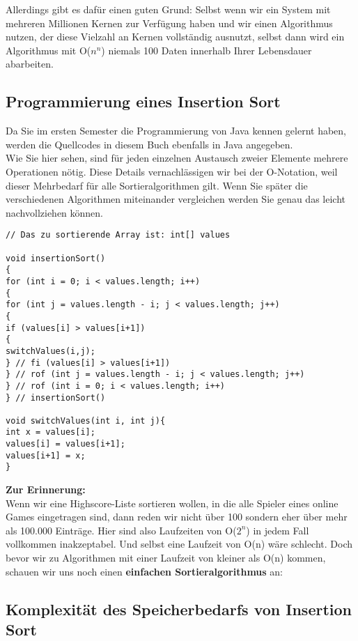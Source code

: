 Allerdings gibt es dafür einen guten Grund: Selbst wenn wir ein System mit mehreren Millionen Kernen zur Verfügung haben und wir einen Algorithmus nutzen, der diese Vielzahl an Kernen vollständig ausnutzt, selbst dann wird ein Algorithmus mit O(\(n^n\)) niemals 100 Daten innerhalb Ihrer Lebensdauer abarbeiten.

\subsection{Programmierung eines Insertion Sort}

Da Sie im ersten Semester die Programmierung von Java kennen gelernt haben, werden die Quellcodes in diesem Buch ebenfalls in Java angegeben.\\

Wie Sie hier sehen, sind für jeden einzelnen Austausch zweier Elemente mehrere Operationen nötig. Diese Details vernachlässigen wir bei der O-Notation, weil dieser Mehrbedarf für alle Sortieralgorithmen gilt. Wenn Sie später die verschiedenen Algorithmen miteinander vergleichen werden Sie genau das leicht nachvollziehen können.

\begin{verbatim}
// Das zu sortierende Array ist: int[] values

void insertionSort()
{
for (int i = 0; i < values.length; i++)
{
for (int j = values.length - i; j < values.length; j++)
{
if (values[i] > values[i+1])
{
switchValues(i,j);
} // fi (values[i] > values[i+1])
} // rof (int j = values.length - i; j < values.length; j++)
} // rof (int i = 0; i < values.length; i++)
} // insertionSort()

void switchValues(int i, int j){
int x = values[i];
values[i] = values[i+1];
values[i+1] = x;
}
\end{verbatim}

\textbf{Zur Erinnerung: }\\

Wenn wir eine Highscore-Liste sortieren wollen, in die alle Spieler eines online Games eingetragen sind, dann reden wir nicht über 100 sondern eher über mehr als 100.000 Einträge. Hier sind also Laufzeiten von O(\(2^n\)) in jedem Fall vollkommen inakzeptabel. Und selbst eine Laufzeit von O(n) wäre schlecht. Doch bevor wir zu Algorithmen mit einer Laufzeit von kleiner als O(n) kommen, schauen wir uns noch einen \textbf{einfachen Sortieralgorithmus} an:

\subsection{Komplexität des Speicherbedarfs von Insertion Sort}

